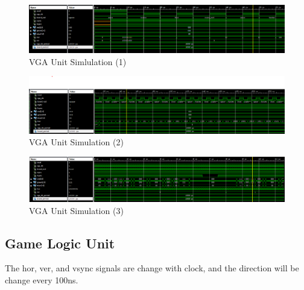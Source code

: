\documentclass{article}
\begin{document}
    \begin{figure}[h]
      \centering
      \includegraphics[width=1\linewidth]{homework3-4}
      \caption{VGA Unit Simlulation (1)}
      \label{fig:homework3-4}
    \end{figure}

    \begin{figure}[h]
      \centering
      \includegraphics[width=1\linewidth]{homework3-5}
      \caption{VGA Unit Simulation (2)}
      \label{fig:homework3-5}
    \end{figure}


    \begin{figure}
      \centering
      \includegraphics[width=1\linewidth]{homework3-6}
      \caption{VGA Unit Simulation (3)}
      \label{fig:homework3-6}
    \end{figure}


    \subsection{Game Logic Unit}
    \label{sec:gamelogicunit}

    The hor, ver, and vsync signals are change with clock, and the direction will be change every 100ns. 
    
\end{document}
